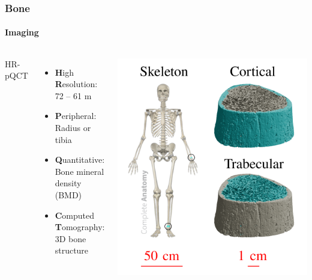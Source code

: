 \documentclass[xcolor=table,11pt]{beamer}
\begin{document}
	\begin{frame}
		\frametitle{Bone}
		\framesubtitle{Imaging}
		\begin{columns}
			HR-pQCT
			\begin{itemize}
				\item \textbf{H}igh \textbf{R}esolution:\\72 – 61 \textmu m
				\item \textbf{P}eripheral:\\Radius or tibia
				\item \textbf{Q}uantitative:\\Bone mineral density (BMD)
				\item \textbf{C}omputed \textbf{T}omography:\\3D bone structure
			\end{itemize}
			\centering
			\includegraphics[width=\linewidth]{Figures/HR-pQCT.png}
		\end{columns}
	\end{frame}
\end{document}
